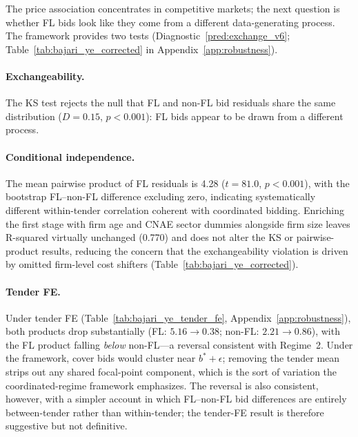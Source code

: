 The price association concentrates in competitive markets; the next
question is whether FL bids look like they come from a different
data-generating process. The \citet{bajari2003deciding} framework
provides two tests
(Diagnostic~\ref{pred:exchange_v6};
Table~\ref{tab:bajari_ye_corrected} in Appendix~\ref{app:robustness}).

\paragraph{Exchangeability.}
The KS test rejects the null that FL and non-FL bid residuals share
the same distribution ($D = 0.15$, $p < 0.001$): FL bids appear to be drawn
from a different process.

\paragraph{Conditional independence.}
The mean pairwise product of FL residuals is 4.28 ($t = 81.0$,
$p < 0.001$), with the bootstrap FL--non-FL difference
excluding zero, indicating systematically different within-tender
correlation coherent with coordinated bidding. Enriching the
first stage with firm age and CNAE sector dummies alongside firm
size leaves R-squared virtually unchanged (0.770) and does not
alter the KS or pairwise-product results, reducing the concern
that the exchangeability violation is driven by omitted firm-level
cost shifters (Table~\ref{tab:bajari_ye_corrected}).

\paragraph{Tender FE.}
Under tender FE (Table~\ref{tab:bajari_ye_tender_fe},
Appendix~\ref{app:robustness}), both products drop substantially
(FL: $5.16 \to 0.38$; non-FL: $2.21 \to 0.86$), with the FL product
falling \emph{below} non-FL---a reversal consistent with Regime~2.
Under the framework, cover bids would cluster near $b^* + \epsilon$;
removing the tender mean strips out any shared focal-point component,
which is the sort of variation the coordinated-regime framework
emphasizes. The reversal is also consistent, however, with a simpler
account in which FL--non-FL bid differences are entirely between-tender
rather than within-tender; the tender-FE result is therefore
suggestive but not definitive.




